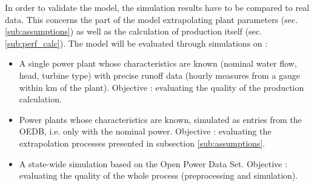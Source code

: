 In order to validate the model, the simulation results have to be compared to real data. This concerns the part of the model extrapolating plant parameters (sec. \ref{sub:assumptions}) as well as the calculation of production itself (sec. \ref{sub:perf_calc}). \newline
The model will be evaluated through simulations on :
\begin{itemize}
 \item A single power plant whose characteristics are known (nominal water flow, head, turbine type) with precise runoff data (hourly measures from a gauge within \unit[2]{km} of the plant). Objective : evaluating the quality of the production calculation.
 \item Power plants whose characteristics are known, simulated as entries from the OEDB, i.e. only with the nominal power. Objective : evaluating the extrapolation processes presented in subsection \ref{sub:assumptions}.
 \item A state-wide simulation based on the Open Power Data Set. Objective : evaluating the quality of the whole process (preprocessing and simulation).
\end{itemize}

